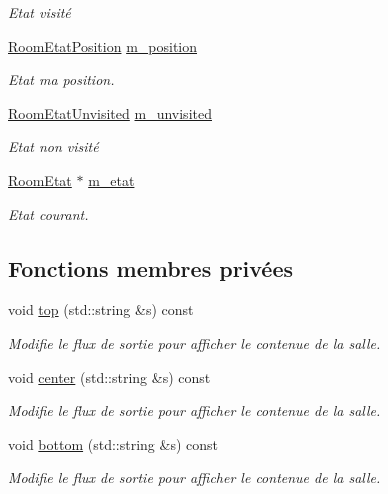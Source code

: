 \begin{DoxyCompactItemize}
\begin{DoxyCompactList}\small\item\em Etat visité \end{DoxyCompactList}\item 
\hypertarget{class_room_aa98c341010116cd18d62dc656ea63503}{\hyperlink{class_room_etat_position}{Room\-Etat\-Position} \hyperlink{class_room_aa98c341010116cd18d62dc656ea63503}{m\-\_\-position}}\label{class_room_aa98c341010116cd18d62dc656ea63503}

\begin{DoxyCompactList}\small\item\em Etat ma position. \end{DoxyCompactList}\item 
\hypertarget{class_room_af92789f3d7f8eeee7ee2ab2daebfc5c5}{\hyperlink{class_room_etat_unvisited}{Room\-Etat\-Unvisited} \hyperlink{class_room_af92789f3d7f8eeee7ee2ab2daebfc5c5}{m\-\_\-unvisited}}\label{class_room_af92789f3d7f8eeee7ee2ab2daebfc5c5}

\begin{DoxyCompactList}\small\item\em Etat non visité \end{DoxyCompactList}\item 
\hypertarget{class_room_acef8df1171e7d81b12ad09fe96df7885}{\hyperlink{class_room_etat}{Room\-Etat} $\ast$ \hyperlink{class_room_acef8df1171e7d81b12ad09fe96df7885}{m\-\_\-etat}}\label{class_room_acef8df1171e7d81b12ad09fe96df7885}

\begin{DoxyCompactList}\small\item\em Etat courant. \end{DoxyCompactList}\end{DoxyCompactItemize}
\subsection*{Fonctions membres privées}
\begin{DoxyCompactItemize}
\item 
void \hyperlink{class_room_a77d4ea167eb2e32638c4da2f84117873}{top} (std\-::string \&s) const 
\begin{DoxyCompactList}\small\item\em Modifie le flux de sortie pour afficher le contenue de la salle. \end{DoxyCompactList}\item 
void \hyperlink{class_room_a792dfc1df5837f19a485b56e68ca4361}{center} (std\-::string \&s) const 
\begin{DoxyCompactList}\small\item\em Modifie le flux de sortie pour afficher le contenue de la salle. \end{DoxyCompactList}\item 
void \hyperlink{class_room_a5f54422b1ad4569692927542c9ff6927}{bottom} (std\-::string \&s) const 
\begin{DoxyCompactList}\small\item\em Modifie le flux de sortie pour afficher le contenue de la salle. \end{DoxyCompactList}\end{DoxyCompactItemize}


